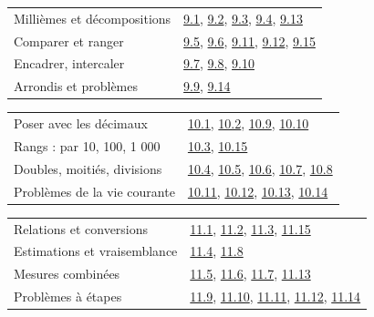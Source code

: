 \begin{tabularx}{\linewidth}{@{}Yl@{}}\toprule
Millièmes et décompositions & \hyperref[exo-9-1]{9.1}, \hyperref[exo-9-2]{9.2}, \hyperref[exo-9-3]{9.3}, \hyperref[exo-9-4]{9.4}, \hyperref[exo-9-13]{9.13}\\[2mm]
Comparer et ranger & \hyperref[exo-9-5]{9.5}, \hyperref[exo-9-6]{9.6}, \hyperref[exo-9-11]{9.11}, \hyperref[exo-9-12]{9.12}, \hyperref[exo-9-15]{9.15}\\[2mm]
Encadrer, intercaler & \hyperref[exo-9-7]{9.7}, \hyperref[exo-9-8]{9.8}, \hyperref[exo-9-10]{9.10}\\[2mm]
Arrondis et problèmes & \hyperref[exo-9-9]{9.9}, \hyperref[exo-9-14]{9.14}\\[2mm]
\bottomrule\end{tabularx}\par\vspace{4mm}
\clearpage
{}\fontsize{10}{13}\selectfont
{}\begin{tabularx}{\linewidth}{@{}Yl@{}}\toprule
Poser avec les décimaux & \hyperref[exo-10-1]{10.1}, \hyperref[exo-10-2]{10.2}, \hyperref[exo-10-9]{10.9}, \hyperref[exo-10-10]{10.10}\\[2mm]
Rangs : par 10, 100, 1 000 & \hyperref[exo-10-3]{10.3}, \hyperref[exo-10-15]{10.15}\\[2mm]
Doubles, moitiés, divisions & \hyperref[exo-10-4]{10.4}, \hyperref[exo-10-5]{10.5}, \hyperref[exo-10-6]{10.6}, \hyperref[exo-10-7]{10.7}, \hyperref[exo-10-8]{10.8}\\[2mm]
Problèmes de la vie courante & \hyperref[exo-10-11]{10.11}, \hyperref[exo-10-12]{10.12}, \hyperref[exo-10-13]{10.13}, \hyperref[exo-10-14]{10.14}\\[2mm]
\bottomrule\end{tabularx}\par\vspace{4mm}
\begin{tabularx}{\linewidth}{@{}Yl@{}}\toprule
Relations et conversions & \hyperref[exo-11-1]{11.1}, \hyperref[exo-11-2]{11.2}, \hyperref[exo-11-3]{11.3}, \hyperref[exo-11-15]{11.15}\\[2mm]
Estimations et vraisemblance & \hyperref[exo-11-4]{11.4}, \hyperref[exo-11-8]{11.8}\\[2mm]
Mesures combinées & \hyperref[exo-11-5]{11.5}, \hyperref[exo-11-6]{11.6}, \hyperref[exo-11-7]{11.7}, \hyperref[exo-11-13]{11.13}\\[2mm]
Problèmes à étapes & \hyperref[exo-11-9]{11.9}, \hyperref[exo-11-10]{11.10}, \hyperref[exo-11-11]{11.11}, \hyperref[exo-11-12]{11.12}, \hyperref[exo-11-14]{11.14}\\[2mm]
\bottomrule\end{tabularx}\par\vspace{4mm}

